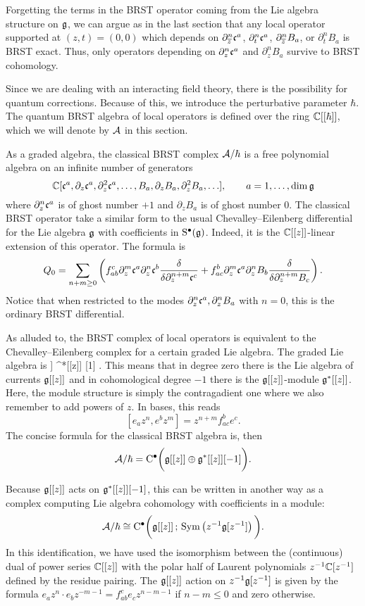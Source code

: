 \documentclass[11pt]{amsart}
\begin{document}
Forgetting the terms in the BRST operator coming from the Lie algebra structure on $\mathfrak g$, we can argue as in the last section that any local operator supported at $(z,t) = (0,0)$ which depends on $\partial^n_{{\overline{z}}} \mathfrak c^a$, $\partial^n_t \mathfrak c^a$, $\partial^n_{{\overline{z}}} B_a$, or $\partial^n_t B_a$ is BRST exact. 
Thus, only operators depending on $\partial_z^n \mathfrak c^a$ and $\partial^n_z B_a$ survive to BRST cohomology.

Since we are dealing with an interacting field theory, there is the possibility for quantum corrections.  
Because of this, we introduce the perturbative parameter $\hbar$. 
The quantum BRST algebra of local operators is defined over the ring $\mathbb C[[\hbar]]$, which we will denote by $\mathcal A$ in this section. 

As a graded algebra, the classical BRST complex $\mathcal A / \hbar$ is a free polynomial algebra on an infinite number of generators
\[
\mathbb C[\mathfrak c^a, \partial_z \mathfrak c^a , \partial^2_z \mathfrak c^a, \ldots, B_a , \partial_z B_a , \partial_z^2 B_a, \ldots], \qquad {a=1, \ldots, \dim \mathfrak g} 
\]
where $\partial_z^n \mathfrak c^a$ is of ghost number $+1$ and $\partial_z B_a$ is of ghost number $0$. 
The classical BRST operator take a similar form to the usual Chevalley--Eilenberg differential for the Lie algebra $\mathfrak g$ with coefficients in ${\rm S}^\bullet (\mathfrak g)$. 
Indeed, it is the $\mathbb C[[z]]$-linear extension of this operator.
The formula is
\[
Q_0 = \sum_{n +m \geq 0} \left(f_{ab}^c \partial_z^m \mathfrak c^a \partial_z^n \mathfrak c^b \frac{\delta}{\delta \partial_z^{n+m}\mathfrak c^c} + f_{ac}^b \partial_{z}^m \mathfrak c^a \partial_z^n B_b \frac{\delta}{\delta \partial_z^{n+m} B_c}\right) .
\] 
Notice that when restricted to the modes $\partial_z^n \mathfrak c^a, \partial_z^n B_a$ with $n=0$, this is the ordinary BRST differential. 

As alluded to, the BRST complex of local operators is equivalent to the Chevalley--Eilenberg complex for a certain graded Lie algebra.
The graded Lie algebra is
\beqn\label{eqn:grLie}
\fg[[z]] \oplus \fg^*[[z]] [1] .
\eeqn
This means that in degree zero there is the Lie algebra of currents $\mathfrak g[[z]]$ and in cohomological degree $-1$ there is the $\mathfrak g[[z]]$-module $\mathfrak g^*[[z]]$. 
Here, the module structure is simply the contragadient one where we also remember to add powers of $z$.
In bases, this reads
\[
[e_a z^n , e^b z^m] = z^{n+m} f_{ac}^{b} e^c  .
\]
The concise formula for the classical BRST algebra is, then
\[
\mathcal A / \hbar = {\rm C}^\bullet \bigg(\mathfrak g[[z]] \oplus \mathfrak g^*[[z]] [-1] \bigg) .
\] 

Because $\mathfrak g[[z]]$ acts on $\mathfrak g^*[[z]][-1]$, this can be written in another way as a complex computing Lie algebra cohomology with coefficients in a module:
\[
\mathcal A / \hbar \cong {\rm C}^\bullet \bigg(\mathfrak g[[z]] \, ; \, \operatorname{Sym} \left(z^{-1} \mathfrak g[z^{-1}]\right) \bigg) .
\]
In this identification, we have used the isomorphism between the (continuous) dual of power series $\mathbb C[[z]]$ with the polar half of Laurent polynomials $z^{-1} \mathbb C[z^{-1}]$ defined by the residue pairing. 
The $\mathfrak g[[z]]$ action on $z^{-1} \mathfrak g[z^{-1}]$ is given by the formula $e_a z^n \cdot e_b z^{-m-1} = f_{ab}^c e_c z^{n-m-1}$ if $n-m \leq 0$ and zero otherwise. 
\end{document}
